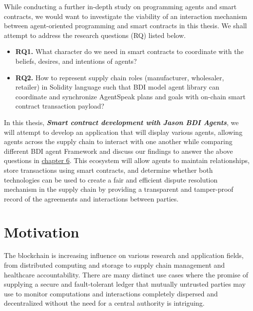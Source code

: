 \vspace{.5cm}
While conducting a further in-depth study on programming agents and smart contracts, we would want to investigate the viability of an interaction mechanism between agent-oriented programming and smart contracts in this thesis. We shall attempt to address the research questions (RQ) listed below.
\begin{itemize}[label={}]

\item \textbf{RQ1.}\label{RQ1.} What character do we need in smart contracts to coordinate with the beliefs, desires, and intentions of agents? \\

 \item \textbf{RQ2.}\label{RQ2.} How to represent supply chain roles (manufacturer, wholesaler, retailer) in Solidity language such that \ac{BDI} model agent library can coordinate and synchronize AgentSpeak plans and goals with on-chain smart contract transaction payload? \\
 
 
\end{itemize}

In this thesis, \textbf{\textit{Smart contract development with Jason \ac{BDI} Agents}}, we will attempt to develop an application that will display various agents, allowing agents across the supply chain to interact with one another while comparing different \ac{BDI} agent Framework and discuss our findings to answer the above questions in \hyperref[sec:discussion]{chapter 6}. This ecosystem will allow agents to maintain relationships, store transactions using smart contracts, and determine whether both technologies can be used to create a fair and efficient dispute resolution mechanism in the supply chain by providing a transparent and tamper-proof record of the agreements and interactions between parties.

\section{Motivation}

The blockchain is increasing influence on various research and application fields, from distributed computing and storage to supply chain management and healthcare accountability. There are many distinct use cases where the promise of supplying a secure and fault-tolerant ledger that mutually untrusted parties may use to monitor computations and interactions completely dispersed and decentralized without the need for a central authority is intriguing. 


